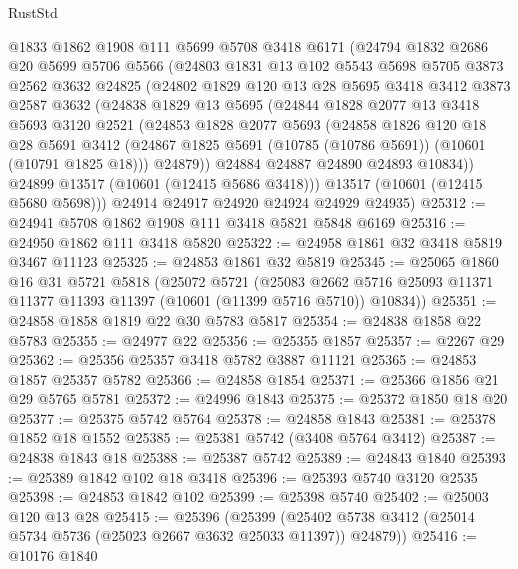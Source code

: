 \begin{lexlean}{RustStd}
\begin{coremodule}
    @1833
    @1862
    @1908
    @111
    @5699
    @5708
    @3418
    @6171
    (@24794
      @1832
      @2686
      @20
      @5699
      @5706
      @5566
      (@24803
        @1831
        @13
        @102
        @5543
        @5698
        @5705
        @3873
        @2562
        @3632
        @24825
        (@24802
          @1829
          @120
          @13
          @28
          @5695
          @3418
          @3412
          @3873
          @2587
          @3632
          (@24838
            @1829
            @13
            @5695
            (@24844
              @1828
              @2077
              @13
              @3418
              @5693
              @3120
              @2521
              (@24853
                @1828
                @2077
                @5693
                (@24858
                  @1826
                  @120
                  @18
                  @28
                  @5691
                  @3412
                  (@24867 @1825 @5691 (@10785 (@10786 @5691)) (@10601 (@10791 @1825 @18)))
                  @24879))
              @24884
              @24887
              @24890
              @24893
              @10834))
          @24899
          @13517
          (@10601 (@12415 @5686 @3418)))
        @13517
        (@10601 (@12415 @5680 @5698)))
      @24914
      @24917
      @24920
      @24924
      @24929
      @24935)
@25312 := @24941 @5708 @1862 @1908 @111 @3418 @5821 @5848 @6169
@25316 := @24950 @1862 @111 @3418 @5820
@25322 := @24958 @1861 @32 @3418 @5819 @3467 @11123
@25325 := @24853 @1861 @32 @5819
@25345 := @25065
    @1860
    @16
    @31
    @5721
    @5818
    (@25072
      @5721
      (@25083 @2662 @5716 @25093 @11371 @11377 @11393 @11397 (@10601 (@11399 @5716 @5710)) @10834))
@25351 := @24858 @1858 @1819 @22 @30 @5783 @5817
@25354 := @24838 @1858 @22 @5783
@25355 := @24977 @22
@25356 := @25355 @1857
@25357 := @2267 @29
@25362 := @25356 @25357 @3418 @5782 @3887 @11121
@25365 := @24853 @1857 @25357 @5782
@25366 := @24858 @1854
@25371 := @25366 @1856 @21 @29 @5765 @5781
@25372 := @24996 @1843
@25375 := @25372 @1850 @18 @20
@25377 := @25375 @5742 @5764
@25378 := @24858 @1843
@25381 := @25378 @1852 @18 @1552
@25385 := @25381 @5742 (@3408 @5764 @3412)
@25387 := @24838 @1843 @18
@25388 := @25387 @5742
@25389 := @24843 @1840
@25393 := @25389 @1842 @102 @18 @3418
@25396 := @25393 @5740 @3120 @2535
@25398 := @24853 @1842 @102
@25399 := @25398 @5740
@25402 := @25003 @120 @13 @28
@25415 := @25396
    (@25399 (@25402 @5738 @3412 (@25014 @5734 @5736 (@25023 @2667 @3632 @25033 @11397)) @24879))
@25416 := @10176 @1840

\end{coremodule}
\end{lexlean}
